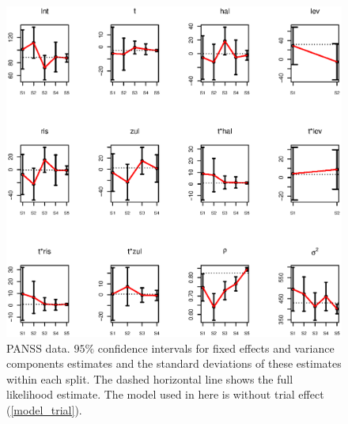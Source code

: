 \documentclass[11pt,a5paper,twoside]{book}
\begin{document}
{\begin{figure}[ht]
\centering
\includegraphics[width=\textwidth]{without_trial_split_by_split.eps}
\caption[PANSS data. $95\%$ confidence intervals for fixed effects and variance components estimates and the standard deviations of these estimates within each split (without trial model)]{PANSS data. $95\%$ confidence intervals for fixed effects and variance components estimates and the standard deviations of these estimates within each split. The dashed horizontal line shows the full likelihood estimate. The model used in here is without trial effect (\ref{model_trial}).} \label{fig_without_trial_split}
\end{figure}

}
\end{document}

